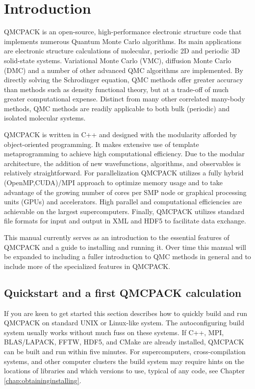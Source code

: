 \chapter{Introduction}
\label{chap:introduction}

QMCPACK is an open-source, high-performance electronic structure code
that implements numerous Quantum Monte Carlo algorithms. Its main
applications are electronic structure calculations of molecular,
periodic 2D and periodic 3D solid-state systems. Variational Monte
Carlo (VMC), diffusion Monte Carlo (DMC) and a number of other
advanced QMC algorithms are implemented. By directly solving the
Schrodinger equation, QMC methods offer greater accuracy than methods
such as density functional theory, but at a trade-off of much greater
computational expense. Distinct from many other correlated many-body
methods, QMC methods are readily applicable to both bulk
(periodic) and isolated molecular systems.

QMCPACK is written in C++ and designed with the modularity afforded by
object-oriented programming. It makes extensive use of template
metaprogramming to achieve high computational efficiency. Due to the
modular architecture, the addition of new wavefunctions, algorithms,
and observables is relatively straightforward. For parallelization
QMCPACK utilizes a fully hybrid (OpenMP,CUDA)/MPI approach to optimize
memory usage and to take advantage of the growing number of cores per
SMP node or graphical processing units (GPUs) and accelerators. High
parallel and computational efficiencies are achievable on the largest
supercomputers. Finally, QMCPACK utilizes standard file formats for
input and output in XML and HDF5 to facilitate data exchange.

This manual currently serves as an introduction to the essential features
of QMCPACK and a guide to installing and running it. Over time this
manual will be expanded to including a fuller introduction to QMC
methods in general and to include more of the specialized features in
QMCPACK.

\section{Quickstart and a first QMCPACK calculation}
If you are keen to get started this section describes how to quickly
build and run QMCPACK on standard UNIX or Linux-like system. The
autoconfiguring build system usually works without much fuss on these
systems.  If C++, MPI, BLAS/LAPACK, FFTW, HDF5, and CMake are already
installed, QMCPACK can be built and run within five minutes. For
supercomputers, cross-compilation systems, and other computer clusters
the build system may require hints on the locations of libraries and
which versions to use, typical of any code, see Chapter \ref{chap:obtaininginstalling}.

